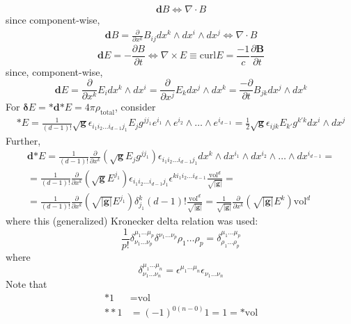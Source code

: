 \documentclass[10pt]{amsart}
\begin{document}
\begin{multicols*}{2}
\[
\mathbf{d}B \Longleftrightarrow \nabla \cdot B
\]
since component-wise, 
\[
\begin{gathered}
	\mathbf{d} B = \frac{ \partial }{ \partial x^k } B_{ij} dx^k \wedge dx^i \wedge dx^j \Longleftrightarrow \nabla \cdot B 
\end{gathered}
\]
\[
\mathbf{d}E = -\frac{ \partial B}{\partial t}   \Longleftrightarrow \nabla \times E \equiv \text{curl} E = \frac{-1}{c} \frac{ \partial \mathbf{B}}{ \partial t}  
\]
since, component-wise, 
\[
\mathbf{d} E = \frac{ \partial }{ \partial x^k} E_i dx^k \wedge dx^i = \frac{ \partial }{ \partial x^j} E_k dx^j \wedge dx^k = \frac{ -\partial }{ \partial t} B_{jk} dx^j \wedge dx^k 
\]
For $\mathbf{\delta} E = \mathbf{*} \mathbf{d} \mathbf{*} E = 4\pi \rho_{\text{total}}$, consider
\[
\begin{gathered}
	\mathbf{*} E = \frac{1}{ (d-1)!} \sqrt{ \mathbf{g}} \epsilon_{i_1i_2 \dots i_{d-1} j_1} E_j g^{jj_1} e^{i_1} \wedge e^{i_2} \wedge \dots \wedge e^{i_{d-1}} = \frac{1}{2} \sqrt{ \mathbf{g}} \epsilon_{ijk} E_{k'} g^{k'k} dx^i \wedge dx^j 
\end{gathered}
\]
Further, 
\[
\begin{gathered}
	\mathbf{d} \mathbf{*} E = \frac{1}{ (d-1)! } \frac{ \partial }{ \partial x^k} (\sqrt{ \mathbf{g}} E_j g^{jj_1} ) \epsilon_{i_1 i_2 \dots i_{d-1} j_1 } dx^k \wedge dx^{i_1} \wedge dx^{i_2} \wedge \dots \wedge dx^{i_{d-1}} = \\
=\frac{1}{(d-1)!} \frac{ \partial }{ \partial x^k} (\sqrt{ \mathbf{g}} E^{j_1} ) \epsilon_{i_1 i_2 \dots i_{d-1} j_1} \epsilon^{ k i_1 i_2 \dots i_{d-1} } \frac{ \text{vol}^d}{ \sqrt{ |\mathbf{g} | } } = \\
=\frac{1}{(d-1)!} \frac{ \partial }{ \partial x^k} (\sqrt{ |\mathbf{g} | } E^{j_1} ) \delta^k_{ j_1} (d-1)! \frac{ \text{vol}^d}{ \sqrt{ |\mathbf{g} | } } = \frac{1}{ \sqrt{ |\mathbf{g} | }} \frac{ \partial }{ \partial x^k} (\sqrt{ |\mathbf{g} |} E^k) \text{vol}^d 
\end{gathered}
\]
where this (generalized) Kronecker delta relation was used: 
\[
\frac{1}{p!} \delta^{\mu_1 \dots \mu_p }_{\nu_1 \dots \nu_p } \delta^{ \nu_1 \dots \nu_p }{ \rho_1 \dots \rho_p } = \delta^{\mu_1 \dots \mu_p }_{ \rho_1 \dots \rho_p }
\]
where 
\[
\delta^{\mu_1 \dots \mu_n }_{ \nu_1 \dots \nu_n } = \epsilon^{\mu_1 \dots \mu_n} \epsilon_{ \nu_1 \dots \nu_n }
\]
Note that 
\[
\begin{aligned}
	*1 & = \text{vol} \\
**1  & = (-1)^{0(n-0)} 1 = 1 = *\text{vol}
\end{aligned}
\]
\end{multicols*}
\end{document}
